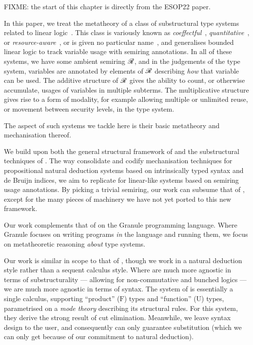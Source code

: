 FIXME: the start of this chapter is directly from the ESOP22 paper.

In this paper, we treat the metatheory of a class of substructural type
systems related to linear logic~\cite{girard87linear}.
This class is variously known as
\emph{coeffectful}~\cite{PetricekOM14,Granule18},
\emph{quantitative}~\cite{BrunelGMZ14,Atkey18}, or
\emph{resource-aware}~\cite{GhicaS14},
or is given no particular name~\cite{reed10distance,abadi99core},
and generalises bounded linear logic to track variable usage with semiring
annotations.
In all of these systems, we have some ambient semiring $\mathscr R$, and in the
judgements of the type system, variables are annotated by elements of $\mathscr R$
describing \emph{how} that variable can be used.
The additive structure of $\mathscr R$ gives the ability to count, or otherwise
accumulate, usages of variables in multiple subterms.
The multiplicative structure gives rise to a form of modality, for example
allowing multiple or unlimited reuse, or movement between security levels, in
the type system.

The aspect of such systems we tackle here is their basic metatheory and
mechanisation thereof.

We build upon both the general structural framework of
\citet{AACMM21} and the substructural techniques of \citet{WA21}.
The way \citeauthor{AACMM21} consolidate and codify mechanisation techniques for
propositional natural deduction systems based on intrinsically typed syntax and
de Bruijn indices, we aim to replicate for linear-like systems based on
semiring usage annotations.
By picking a trivial semiring, our work can subsume that of
\citeauthor{AACMM21}, except for the many pieces of machinery we have not yet
ported to this new framework.

Our work complements that of \citet{Granule18} on the Granule programming
language.
Where Granule focuses on writing programs \emph{in} the language and running
them, we focus on metatheoretic reasoning \emph{about} type systems.

Our work is similar in scope to that of \citet{LicataSR17}, though we work in
a natural deduction style rather than a sequent calculus style.
Where \citeauthor{LicataSR17} are much more agnostic in terms of
substructurality --- allowing for non-commutative and bunched logics ---
we are much more agnostic in terms of syntax.
The system of \citeauthor{LicataSR17} is essentially a single calculus,
supporting ``product'' ($\mathrm F$) types and ``function'' ($\mathrm U$)
types, parametrised on a \emph{mode theory} describing its structural rules.
For this system, they derive the strong result of cut elimination.
Meanwhile, we leave syntax design to the user, and consequently can only
guarantee substitution (which we can only get because of our commitment to
natural deduction).

